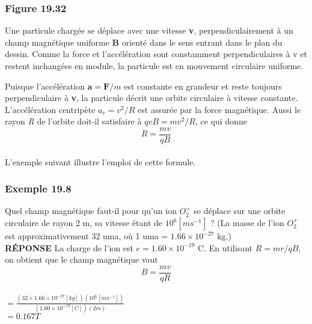 \documentclass[../main.tex]{subfiles}
\begin{document}
\subsubsection*{Figure 19.32}
Une particule chargée se déplace avec une vitesse \textbf{v}, perpendiculairement à un champ magnétique uniforme \textbf{B} orienté dans le sens entrant dans le plan du dessin. Comme la force et l'accélération sont constamment perpendiculaires à v et restent inchangées en module, la particule est en mouvement circulaire uniforme.\\
\par Puisque l'accélération $\textbf{a} = \textbf{F}/m$ est constante en grandeur et reste toujours perpendiculaire à \textbf{v}, la particule décrit une orbite circulaire à vitesse constante. L'accélération centripète $a_r = v^2/R$ est assurée par la force magnétique. Aussi le rayon \textit{R} de l'orbite doit-il satisfaire à $qvB = mv^2/R$, ce qui donne \\
$$R = \frac{mv}{qB}$$ \\
L'exemple suivant illustre l'emploi de cette formule.
\subsubsection{Exemple 19.8}
Quel champ magnétique faut-il pour qu'un ion $O_2^+$ se déplace sur une orbite circulaire de rayon 2 m, sa vitesse étant de $10^6 [ms^{-1}]$ ? (La masse de l'ion $O_2^+$ est approximativement 32 uma, où 1 uma = $1.66 \times 10^{-27}$ kg.)\\
\textbf{RÉPONSE} \quad La charge de l'ion est $e = 1.60 \times 10^{-19}$ C. En utilisant $R = mr/qB$, on obtient que le champ magnétique vaut \\
$$B = \frac{mv}{qR}$$ \\
$= \frac{(32 \times 1.66 \times 10^{-27}[kg])(10^6 [ms^{-1}])}{(1.60 \times 10^{-19}[C])(2 m)}$\\
$= 0.167 T$\\
\end{document}
